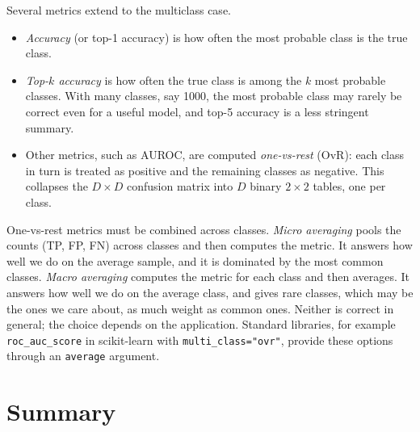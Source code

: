 Several metrics extend to the multiclass case.
\begin{itemize}
  \item \emph{Accuracy} (or top-1 accuracy) is how often the most probable class is the true class.
  \item \emph{Top-$k$ accuracy} is how often the true class is among the $k$ most probable classes. With many classes, say 1000, the most probable class may rarely be correct even for a useful model, and top-5 accuracy is a less stringent summary.
  \item Other metrics, such as AUROC, are computed \emph{one-vs-rest} (OvR): each class in turn is treated as positive and the remaining classes as negative. This collapses the $D\times D$ confusion matrix into $D$ binary $2\times 2$ tables, one per class.
\end{itemize}
One-vs-rest metrics must be combined across classes. \emph{Micro averaging} pools the counts (TP, FP, FN) across classes and then computes the metric. It answers how well we do on the average sample, and it is dominated by the most common classes. \emph{Macro averaging} computes the metric for each class and then averages. It answers how well we do on the average class, and gives rare classes, which may be the ones we care about, as much weight as common ones. Neither is correct in general; the choice depends on the application. Standard libraries, for example \texttt{roc\_auc\_score} in scikit-learn with \texttt{multi\_class="ovr"}, provide these options through an \texttt{average} argument.

\section{Summary}


